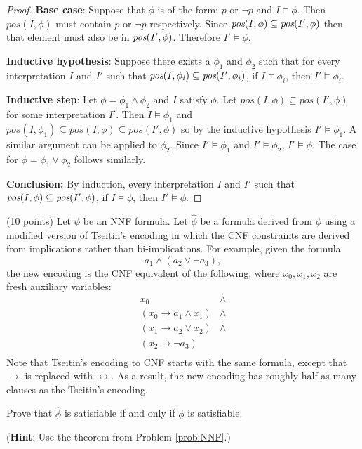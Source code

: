 \documentclass{article}
\newenvironment{solution}{\color{blue} \em }{}
\begin{document}
\begin{enumerate}
\begin{solution}
\begin{proof}
\item \textbf{Base case}: Suppose that $\phi$ is of the form: $p$ or $\neg p$ and $I \models \phi$. Then $pos(I, \phi)$ must contain $p$ or $\neg p$ respectively. Since $\emph{pos}(I, \phi) \subseteq \emph{pos}(I', \phi)$ then that element must also be in $\emph{pos}(I', \phi)$. Therefore $I' \models \phi$.

\item \textbf{Inductive hypothesis}: Suppose there exists a $\phi_1$ and $\phi_2$ such that for every interpretation $I$ and $I'$ such that $\emph{pos}(I, \phi_i) \subseteq \emph{pos}(I', \phi_i)$, if $I \models \phi_i$, then $I' \models \phi_i$.

\item \textbf{Inductive step}:
    Let $\phi = \phi_1 \land \phi_2$ and $I$ satisfy $\phi$. Let $pos(I, \phi) \subseteq pos(I', \phi)$ for some interpretation $I'$.  Then $I \models \phi_1$ and $pos(I, \phi_1) \subseteq pos(I, \phi) \subseteq pos(I', \phi)$ so by the inductive hypothesis $I' \models \phi_1$. A similar argument can be applied to $\phi_2$. Since $I' \models \phi_1$ and $I' \models \phi_2$, $I' \models \phi$.
The case for $\phi = \phi_1 \lor \phi_2$ follows similarly.

\item \textbf{Conclusion: } By induction, every interpretation $I$ and $I'$ such that $\emph{pos}(I, \phi) \subseteq \emph{pos}(I', \phi)$, if $I \models \phi$, then $I' \models \phi$.


\end{proof}
\end{solution}



\item (10 points) Let $\phi$ be an NNF formula.  Let $\hat{\phi}$ be a formula derived from $\phi$ using a modified version of Tseitin's encoding in which the CNF constraints are derived from implications rather than bi-implications.   For example, given the formula
\[a_1\land (a_2 \lor \neg a_3),\]
the new encoding is the CNF equivalent of the following, where $x_0, x_1, x_2$ are fresh auxiliary variables:
\[
\begin{array}{ll}
x_0 & \land \\
(x_0 \rightarrow a_1 \land x_1) & \land \\
(x_1 \rightarrow a_2 \lor x_2) & \land \\
(x_2 \rightarrow \neg a_3) &  \\
\end{array}
\]
Note that Tseitin's encoding to CNF starts with the same formula, except that $\rightarrow$ is replaced with $\leftrightarrow$.  As a result, the new encoding has roughly half as many clauses as the Tseitin's encoding.

\medskip
Prove that $\hat{\phi}$ is satisfiable if and only if $\phi$ is satisfiable.

\medskip
(\textbf{Hint}: Use the theorem from Problem \ref{prob:NNF}.)


\end{enumerate}
\end{document}
